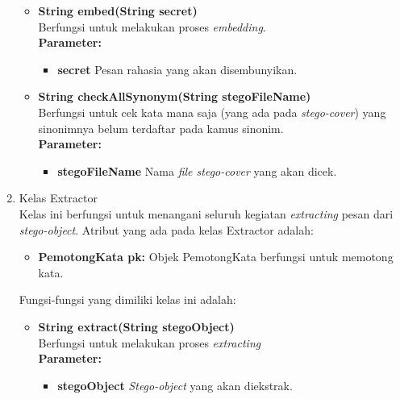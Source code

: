 \begin{enumerate}
\begin{itemize}
		\item \textbf{String embed(String secret)}\\
		Berfungsi untuk melakukan proses \textit{embedding}.\\
		\textbf{Parameter:}
		\begin{itemize}
			\item \textbf{secret} Pesan rahasia yang akan disembunyikan.
		\end{itemize}
		
		\item \textbf{String checkAllSynonym(String stegoFileName)}\\
		Berfungsi untuk cek kata mana saja (yang ada pada \textit{stego-cover}) yang sinonimnya belum terdaftar pada kamus sinonim.\\
		\textbf{Parameter:}
		\begin{itemize}
			\item \textbf{stegoFileName} Nama \textit{file stego-cover} yang akan dicek.
		\end{itemize}
	\end{itemize}
	
	\item Kelas Extractor\\
	Kelas ini berfungsi untuk menangani seluruh kegiatan \textit{extracting} pesan dari \textit{stego-object}. Atribut yang ada pada kelas Extractor adalah:
	\begin{itemize}
		\item \textbf{PemotongKata pk:} Objek PemotongKata berfungsi untuk memotong kata.
	\end{itemize}
	
	Fungsi-fungsi yang dimiliki kelas ini adalah:
	
	\begin{itemize}	
	
		\item \textbf{String extract(String stegoObject)}\\
		Berfungsi untuk melakukan proses \textit{extracting}\\
		\textbf{Parameter:}
		\begin{itemize}
			\item \textbf{stegoObject} \textit{Stego-object} yang akan diekstrak.
		\end{itemize}
				
	\end{itemize}
	
	
	

\end{enumerate}
